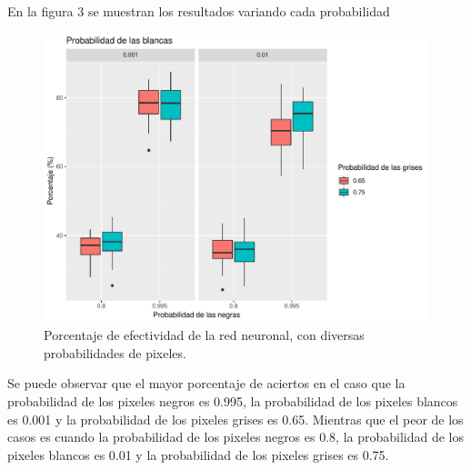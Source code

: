 \documentclass[10pt,a4paper]{article}
\begin{document}
En la figura 3 se muestran los resultados variando cada probabilidad
\begin{figure}[H]
  \centering
  \includegraphics[scale=.8]{retoo1}
  \caption{Porcentaje de efectividad de la red neuronal, con diversas probabilidades de pixeles. }
\end{figure} 
Se puede observar que el mayor porcentaje de aciertos en el caso que la probabilidad de los pixeles negros es 0.995, la probabilidad de los pixeles blancos es 0.001 y la probabilidad de los pixeles grises es 0.65. Mientras que el peor de los casos es cuando la probabilidad de los pixeles negros es 0.8, la probabilidad de los pixeles blancos es 0.01 y la probabilidad de los pixeles grises es 0.75.
\newpage
\end{document}
